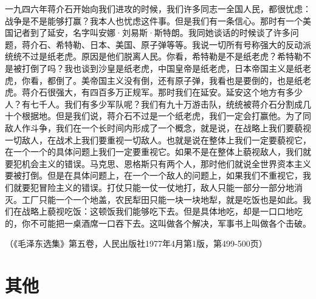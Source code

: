 \documentclass[cn,11pt,chinese]{elegantbook}
\begin{document}
一九四六年蒋介石开始向我们进攻的时候，我们许多同志一全国人民，都很忧虑：战争是不是能够打赢？我本人也忧虑这件事。但是我们有一条信心。那时有一个美国记者到了延安，名字叫安娜·刘易斯·斯特朗。我同她谈话的时候谈了许多问题，蒋介石、希特勒、日本、美国、原子弹等等。我说一切所有号称强大的反动派统统不过是纸老虎。原因是他们脱离人民。你看，希特勒是不是纸老虎？希特勒不是被打倒了吗？我也谈到沙皇是纸老虎，中国皇帝是纸老虎，日本帝国主义是纸老虎，你看，都倒了。美帝国主义没有倒，还有原子弹，我看也是要倒的，也是纸老虎。蒋介石很强大，有四百多万正规军。那时我们在延安。延安这个地方有多少人？有七千人。我们有多少军队呢？我们有九十万游击队，统统被蒋介石分割成几十个根据地。但是我们说，蒋介石不过是一个纸老虎，我们一定会打赢他。为了同敌人作斗争，我们在一个长时间内形成了一个概念，就是说，在战略上我们要藐视一切敌人，在战术上我们要重视一切敌人。也就是说在整体上我们一定要藐视它，在一个一个的具体问题上我们一定要重视它。如果不是在整体上藐视敌人，我们就要犯机会主义的错误。马克思、恩格斯只有两个人，那时他们就说全世界资本主义要被打倒。但是在具体问题上，在一个一个敌人的问题上，如果我们不重视它，我们就要犯冒险主义的错误。打仗只能一仗一仗地打，敌人只能一部分一部分地消灭。工厂只能一个一个地盖，农民犁田只能一块一块地犁，就是吃饭也是如此。我们在战略上藐视吃饭：这顿饭我们能够吃下去。但是具体地吃，却是一口口地吃的，你不可能把一桌酒席一口吞下去。这叫做各个解决，军事书上叫做各个击破。\\
\begin{flushright}（《毛泽东选集》第五卷，人民出版社1977年4月第1版，第499-500页）\end{flushright}
\newpage

\chapter*{其他}\newpage
\end{document}
